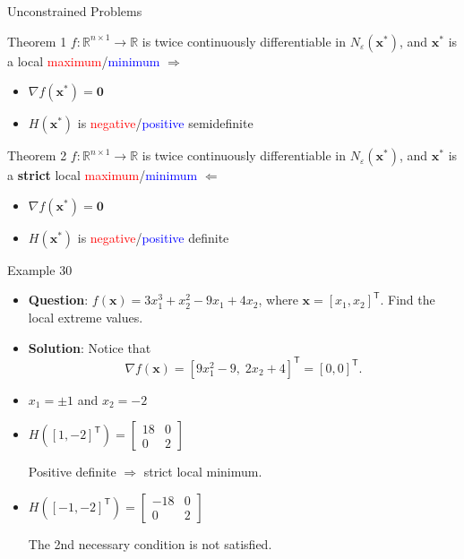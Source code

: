 \documentclass[aspectratio=169,hyperref,UTF8,CJK]{beamer}
\newcommand{\R}{\mathbb{R}}
\newcommand{\trans}{\mathsf{T}}
\newcommand{\vect}[1]{\boldsymbol{#1}}
\begin{document}
\begin{frame}{Unconstrained Problems}
  \small
  \begin{block}{Theorem 1}
    $f:\R^{n\times1}\to\R$ is twice continuously differentiable in $N_{\varepsilon}(\vect{x}^{*})$, and $\vect{x}^{*}$ is a local \textcolor{red}{maximum}/\textcolor{blue}{minimum} $\Longrightarrow$
    \begin{itemize}
      \item $\nabla f(\vect{x}^{*})=\vect{0}$
      \item $H(\vect{x}^{*})$ is \textcolor{red}{negative}/\textcolor{blue}{positive} semidefinite
    \end{itemize}
  \end{block}
  \begin{block}{Theorem 2}
    $f:\R^{n\times1}\to\R$ is twice continuously differentiable in $N_{\varepsilon}(\vect{x}^{*})$, and $\vect{x}^{*}$ is a \textbf{strict} local \textcolor{red}{maximum}/\textcolor{blue}{minimum} $\Longleftarrow$
    \begin{itemize}
      \item $\nabla f(\vect{x}^{*})=\vect{0}$
      \item $H(\vect{x}^{*})$ is \textcolor{red}{negative}/\textcolor{blue}{positive} definite
    \end{itemize}
  \end{block}
\end{frame}

\begin{frame}{Example 30}
  \small
  \begin{itemize}
    \item \textbf{Question}: $f(\vect{x})=3x_1^3+x_2^2-9x_1+4x_2$, where $\vect{x}=[x_1,x_2]^{\trans}$. Find the local extreme values.
    \item \textbf{Solution}: Notice that
      \begin{equation*}
        \nabla f(\vect{x})=[9x_1^2-9,\;2x_2+4]^{\trans}=[0,0]^{\trans}.
      \end{equation*}
    \item $x_1=\pm1$ and $x_2=-2$
    \item $H([1,-2]^{\trans})=\begin{bmatrix}18&0\\0&2\end{bmatrix}$

      Positive definite $\Longrightarrow$ strict local minimum.
    \item $H([-1,-2]^{\trans})=\begin{bmatrix}-18&0\\0&2\end{bmatrix}$

      The 2nd necessary condition is not satisfied.
  \end{itemize}
\end{frame}
\end{document}
